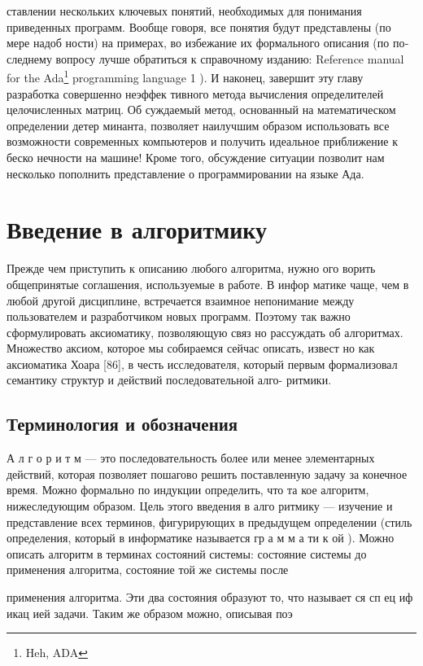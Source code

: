\documentclass{mai_book}
\begin{document}
\pagebreak
ставлении нескольких ключевых понятий, необходимых для понимания
приведенных программ.
Вообще говоря, все понятия будут представлены (по мере надоб­
ности) на примерах, во избежание их формального описания (по по­
следнему вопросу лучше обратиться к справочному изданию: Reference
manual for the Ada\footnote{Heh, ADA} programming language 1 ).
И наконец, завершит эту главу разработка совершенно неэффек­
тивного метода вычисления определителей целочисленных матриц. Об­
суждаемый метод, основанный на математическом определении детер­
минанта, позволяет наилучшим образом использовать все возможности
современных компьютеров и получить идеальное приближение к беско­
нечности на машине! Кроме того, обсуждение ситуации позволит нам
несколько пополнить представление о программировании на языке Ада.

\section{Введение в алгоритмику}

Прежде чем приступить к описанию любого алгоритма, нужно ого­
ворить общепринятые соглашения, используемые в работе. В инфор­
матике чаще, чем в любой другой дисциплине, встречается взаимное
непонимание между пользователем и разработчиком новых программ.
Поэтому так важно сформулировать аксиоматику, позволяющую связ­
но рассуждать об алгоритмах.
Множество аксиом, которое мы собираемся сейчас описать, извест­
но как аксиоматика Хоара [86], в честь исследователя, который первым
формализовал семантику структур и действий последовательной алго-
ритмики.

\subsection{Терминология и обозначения}

А л г о р и т м — это последовательность более или менее элементарных
действий, которая позволяет пошагово решить поставленную задачу за
конечное время. Можно формально по индукции определить, что та­
кое алгоритм, нижеследующим образом. Цель этого введения в алго­
ритмику — изучение и представление всех терминов, фигурирующих в
предыдущем определении (стиль определения, который в информатике
называется гр а м м а ти к ой ).
Можно описать алгоритм в терминах состояний системы: состояние
системы до применения алгоритма, состояние той же системы после

\pagebreak

применения алгоритма. Эти два состояния образуют то, что называет­
ся сп ец иф икац ией задачи. Таким же образом можно, описывая поэ
\end{document}

